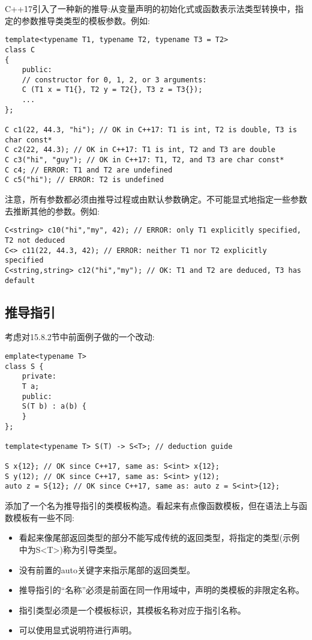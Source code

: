 
C++17引入了一种新的推导:从变量声明的初始化式或函数表示法类型转换中，指定的参数推导类类型的模板参数。例如:

\begin{lstlisting}[style=styleCXX]
template<typename T1, typename T2, typename T3 = T2>
class C
{
	public:
	// constructor for 0, 1, 2, or 3 arguments:
	C (T1 x = T1{}, T2 y = T2{}, T3 z = T3{});
	...
};

C c1(22, 44.3, "hi"); // OK in C++17: T1 is int, T2 is double, T3 is char const*
C c2(22, 44.3); // OK in C++17: T1 is int, T2 and T3 are double
C c3("hi", "guy"); // OK in C++17: T1, T2, and T3 are char const*
C c4; // ERROR: T1 and T2 are undefined
C c5("hi"); // ERROR: T2 is undefined
\end{lstlisting}

注意，所有参数都必须由推导过程或由默认参数确定。不可能显式地指定一些参数去推断其他的参数。例如:

\begin{lstlisting}[style=styleCXX]
C<string> c10("hi","my", 42); // ERROR: only T1 explicitly specified, T2 not deduced
C<> c11(22, 44.3, 42); // ERROR: neither T1 nor T2 explicitly specified
C<string,string> c12("hi","my"); // OK: T1 and T2 are deduced, T3 has default
\end{lstlisting}

\subsection{推导指引}

考虑对15.8.2节中前面例子做的一个改动:

\begin{lstlisting}[style=styleCXX]
emplate<typename T>
class S {
	private:
	T a;
	public:
	S(T b) : a(b) {
	}
};

template<typename T> S(T) -> S<T>; // deduction guide

S x{12}; // OK since C++17, same as: S<int> x{12};
S y(12); // OK since C++17, same as: S<int> y(12);
auto z = S{12}; // OK since C++17, same as: auto z = S<int>{12};
\end{lstlisting}

添加了一个名为推导指引的类模板构造。看起来有点像函数模板，但在语法上与函数模板有一些不同:

\begin{itemize}
\item 
看起来像尾部返回类型的部分不能写成传统的返回类型，将指定的类型(示例中为S<T>)称为引导类型。

\item 
没有前置的auto关键字来指示尾部的返回类型。

\item 
推导指引的“名称”必须是前面在同一作用域中，声明的类模板的非限定名称。

\item 
指引类型必须是一个模板标识，其模板名称对应于指引名称。

\item 
可以使用显式说明符进行声明。
\end{itemize}	

